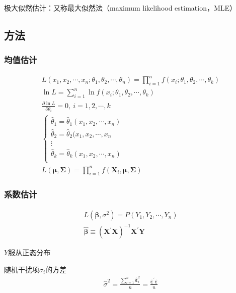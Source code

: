 \documentclass[12pt]{book}
\begin{document}
极大似然估计：又称最大似然法（maximum likelihood estimation，MLE）

\subsection{方法}
\subsubsection{均值估计}

\begin{gather*}
    L\left(x_1,x_2,\cdots,x_n;\theta_1,\theta_2,\cdots,\theta_n\right) =\prod_{i=1}^{n}f\left(x_i;\theta_1,\theta_2,\cdots,\theta_k\right)\\
    \ln{L=\sum_{i=1}^{n}} \ln{f\left(x_i;\theta_1,\theta_2,\cdots,\theta_k\right)}\\
    \frac{\partial \ln{L}}{\partial\theta_i}=0,\ i=1,2,\cdots,k\\
    \begin{cases}
        \hat{\theta}_1 = \hat{\theta}_1(x_1,x_2,\cdots,x_n) \\
        \hat{\theta}_2 = \hat{\theta}_2(x_1,x_2,\cdots,x_n  \\
        \vdots                                              \\
        \hat{\theta}_k = \hat{\theta}_k(x_1,x_2,\cdots,x_n) \\
    \end{cases}	\\
    L\left(\bm{\mu},\bm{\Sigma}\right) =\prod_{i=1}^{n}{f(\bm{X}_i,\bm{\mu},\bm{\Sigma})}
\end{gather*}


\subsubsection{系数估计}

\begin{gather*}
    L\left(\bm{\beta},\sigma^2\right) 	=P\left(Y_1,Y_2,\cdots,Y_n\right) \\
    \hat{\bm{\beta}} 	\equiv \left(\bm{X}^\prime\bm{X}\right)^{-1}\bm{X}^\prime\bm{Y}
\end{gather*}


$Y$服从正态分布

随机干扰项$\sigma_i$的方差
\begin{gather*}
    {\hat{\sigma}}^2
    =\frac{
    \sum_{i=1}^{n}{
    {\hat{\bm{\varepsilon}}}_i^2}
    }{n}
    =\frac{
        {\hat{\bm{\varepsilon}}}^\prime \hat{\bm{\varepsilon}}
    }{n}
\end{gather*}
\end{document}
